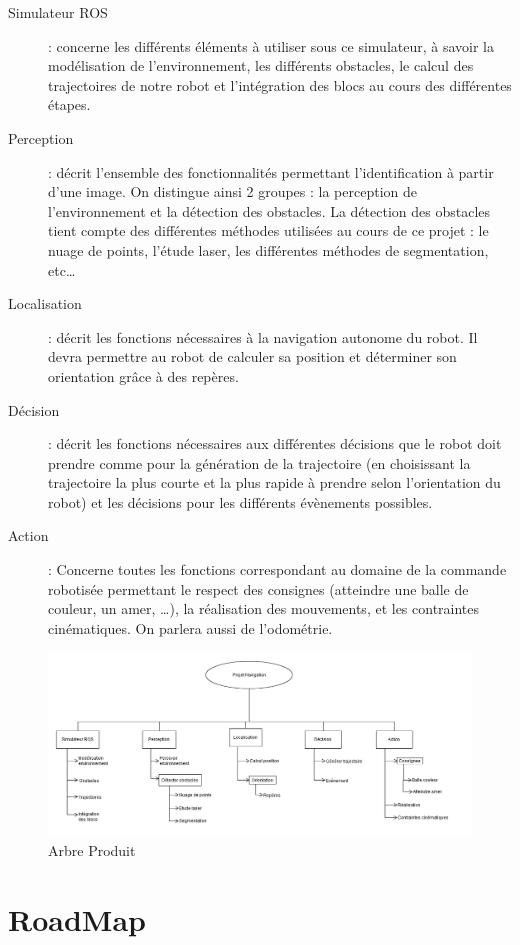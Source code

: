 \documentclass[10pt,a4paper]{article}
\begin{document}
\begin{description}
\item [Simulateur ROS] : concerne les différents éléments à utiliser sous ce simulateur, à savoir la modélisation de l’environnement, les différents obstacles, le calcul des trajectoires de notre robot et l’intégration des blocs au cours des différentes étapes.
\item  [Perception] : décrit l’ensemble des fonctionnalités permettant l’identification à partir d’une image. On distingue ainsi 2 groupes : la perception de l’environnement et la détection des obstacles. La détection des obstacles tient compte des différentes méthodes utilisées au cours de ce projet : le nuage de points, l’étude laser, les différentes méthodes de segmentation, etc…
\item [Localisation] : décrit les fonctions nécessaires à la navigation autonome du robot. Il devra permettre au robot de calculer sa position et déterminer son orientation grâce à des repères.
\item [Décision] : décrit les fonctions nécessaires aux différentes décisions que le robot doit prendre comme pour la génération de la trajectoire (en choisissant la trajectoire la plus courte et la plus rapide à prendre selon l’orientation du robot) et les décisions pour les différents évènements possibles.
\item [Action] : Concerne toutes les fonctions correspondant au domaine de la commande robotisée permettant le respect des consignes (atteindre une balle de couleur, un amer, …), la réalisation des mouvements, et les contraintes cinématiques. On parlera aussi de l’odométrie.
\end{description}

\begin{figure}
  \centering
\noindent\includegraphics[width=13cm]{arbreproduit.png} 
  \caption{Arbre Produit}
\end{figure}

\section{RoadMap}
\end{document}
